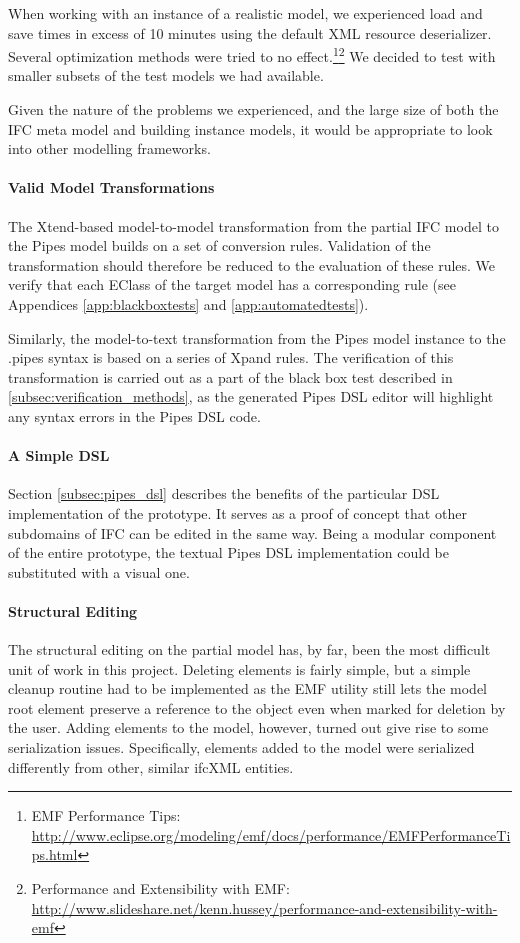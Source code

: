 When working with an instance of a realistic model, we experienced load and save times in excess of 10 minutes using the default XML resource deserializer. Several optimization methods were tried to no effect.\footnote{EMF Performance Tips: \url{http://www.eclipse.org/modeling/emf/docs/performance/EMFPerformanceTips.html}}\footnote{Performance and Extensibility with EMF: \url{http://www.slideshare.net/kenn.hussey/performance-and-extensibility-with-emf}} We decided to test with smaller subsets of the test models we had available.

Given the nature of the problems we experienced, and the large size of both the IFC meta model and building instance models, it would be appropriate to look into other modelling frameworks.

\paragraph{Valid Model Transformations} The Xtend-based model-to-model transformation from the partial IFC model to the Pipes model builds on a set of conversion rules. Validation of the transformation should therefore be reduced to the evaluation of these rules. We verify that each EClass of the target model has a corresponding rule (see Appendices \ref{app:blackboxtests} and \ref{app:automatedtests}).

Similarly, the model-to-text transformation from the Pipes model instance to the .pipes syntax is based on a series of Xpand rules. The verification of this transformation is carried out as a part of the black box test described in \ref{subsec:verification_methods}, as the generated Pipes DSL editor will highlight any syntax errors in the Pipes DSL code.

\paragraph{A Simple DSL} Section \ref{subsec:pipes_dsl} describes the benefits of the particular DSL implementation of the prototype. It serves as a proof of concept that other subdomains of IFC can be edited in the same way. Being a modular component of the entire prototype, the textual Pipes DSL implementation could be substituted with a visual one.

\paragraph{Structural Editing} The structural editing on the partial model has, by far, been the most difficult unit of work in this project. Deleting elements is fairly simple, but a simple cleanup routine had to be implemented as the EMF utility still lets the model root element preserve a reference to the object even when marked for deletion by the user. Adding elements to the model, however, turned out give rise to some serialization issues. Specifically, elements added to the model were serialized differently from other, similar ifcXML entities.


